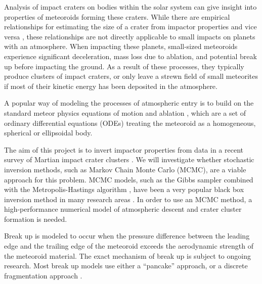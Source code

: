 Analysis of impact craters on bodies within the solar system can give insight into properties of meteoroids forming these craters.
While there are empirical relationships for estimating the size of a crater from impactor properties and vice versa \citep[e.g.][]{holsapple1987scaling}, these relationships are not directly applicable to small impacts on planets with an atmosphere.
When impacting these planets, small-sized meteoroids experience significant deceleration, mass loss due to ablation, and potential break up before impacting the ground.
As a result of these processes, they typically produce clusters of impact craters, or only leave a strewn field of small meteorites if most of their kinetic energy has been deposited in the atmosphere.

A popular way of modeling the processes of atmospheric entry is to build on the standard meteor physics equations of motion and ablation \citep[e.g.][]{opik1958physics}, which are a set of ordinary differential equations (ODEs) treating the meteoroid as a homogeneous, spherical or ellipsoidal body.

The aim of this project is to invert impactor properties from data in a recent survey of Martian impact crater clusters \citep{daubar2019recently}.
We will investigate whether stochastic inversion methods, such as Markov Chain Monte Carlo (MCMC), are a viable approach for this problem.
MCMC models, such as the Gibbs sampler combined with the Metropolis-Hastings algorithm \citep{gelfand1990sampling}, have been a very popular black box inversion method in many research areas \citep[e.g., in epidemiology][]{flaxman2020estimating}.
In order to use an MCMC method, a high-performance numerical model of atmospheric descent and crater cluster formation is needed.


Break up is modeled to occur when the pressure difference between the leading edge and the trailing edge of the meteoroid exceeds the aerodynamic strength of the meteoroid material.
The exact mechanism of break up is subject to ongoing research. Most break up models use either a ``pancake'' approach, or a discrete fragmentation approach \citep{register2017asteroid}.

